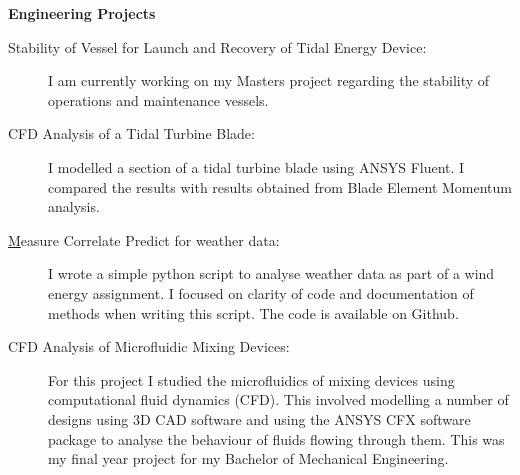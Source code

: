 \documentclass[letterpaper,11pt]{article}
\newcommand{\resheading}[1]{{\large \colorbox{mygrey}{\begin{minipage}{\textwidth}{\textbf{#1 \vphantom{p\^{E}}}}\end{minipage}}}}
\begin{document}
\resheading{Engineering Projects}

\begin{description}
\item[Stability of Vessel for Launch and Recovery of Tidal Energy Device:] {I am currently working on my Masters project regarding the stability of operations and maintenance vessels.}

\item[CFD Analysis of a Tidal Turbine Blade:] {I modelled a section of a tidal turbine blade using ANSYS Fluent. I compared the results with results obtained from Blade Element Momentum analysis.}

\item[{\href{https://github.com/peteretep/measure-correlate-predict}Measure Correlate Predict for weather data}:] { I wrote a simple python script to analyse weather data as part of a wind energy assignment. I focused on clarity of code and documentation of methods when writing this script. The code is available on Github.}

\item[CFD Analysis of Microfluidic Mixing Devices:] { For this project I studied the microfluidics of mixing devices using computational fluid dynamics (CFD). This involved modelling a number of designs using 3D CAD software and using the ANSYS CFX software package to analyse the behaviour of fluids flowing through them. This was my final year project for my Bachelor of Mechanical Engineering. }

\end{description}
\end{document}

